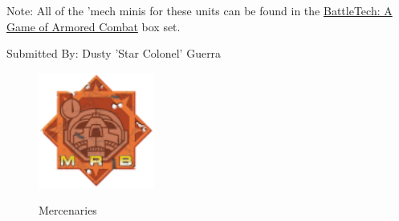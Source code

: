 Note: All of the 'mech minis for these units can be found in the \href{https://www.sarna.net/wiki/BattleTech:_A_Game_of_Armored_Combat}{BattleTech: A Game of Armored Combat} box set. 

Submitted By: Dusty 'Star Colonel' Guerra

\begin{figure}[!h]
  \centering
  \includegraphics[alt='Mercenary Logo', width=1.5in, height=1.5in]{img/Mercenary.png}
  \caption*{Mercenaries}
\end{figure}

